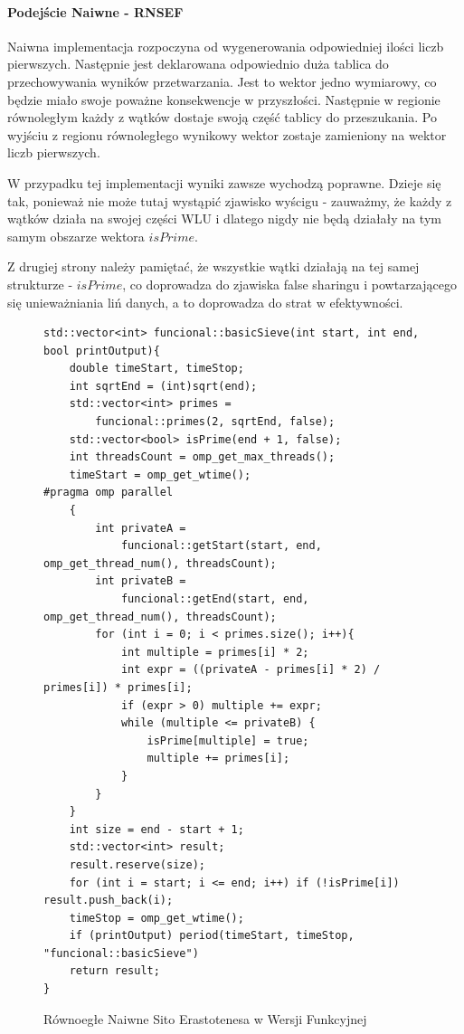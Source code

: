 \documentclass{article}
\begin{document}
                    \paragraph{Podejście Naiwne - \gls{RNSEF}}
                        Naiwna implementacja rozpoczyna od wygenerowania odpowiedniej ilości liczb pierwszych. Następnie jest deklarowana odpowiednio duża tablica do przechowywania wyników przetwarzania. Jest to wektor jedno wymiarowy, co będzie miało swoje poważne konsekwencje w przyszłości. Następnie w regionie równoległym każdy z wątków dostaje swoją część tablicy do przeszukania. Po wyjściu z regionu równoległego wynikowy wektor zostaje zamieniony na wektor liczb pierwszych.
                        
                        W przypadku tej implementacji wyniki zawsze wychodzą poprawne. Dzieje się tak, ponieważ nie może tutaj wystąpić zjawisko wyścigu - zauważmy, że każdy z wątków działa na swojej części \gls{WLU} i dlatego nigdy nie będą działały na tym samym obszarze wektora $isPrime$.
                        
                        Z drugiej strony należy pamiętać, że wszystkie wątki działają na tej samej strukturze - $isPrime$, co doprowadza do zjawiska false sharingu i powtarzającego się unieważniania liń danych, a to doprowadza do strat w efektywności.
                        \begin{figure}
                            \begin{verbatim}
std::vector<int> funcional::basicSieve(int start, int end, bool printOutput){
    double timeStart, timeStop;
    int sqrtEnd = (int)sqrt(end);
    std::vector<int> primes = 
        funcional::primes(2, sqrtEnd, false);
    std::vector<bool> isPrime(end + 1, false);
    int threadsCount = omp_get_max_threads();
    timeStart = omp_get_wtime();
#pragma omp parallel 
    {
        int privateA = 
            funcional::getStart(start, end, omp_get_thread_num(), threadsCount);
        int privateB = 
            funcional::getEnd(start, end, omp_get_thread_num(), threadsCount);
        for (int i = 0; i < primes.size(); i++){
            int multiple = primes[i] * 2;
            int expr = ((privateA - primes[i] * 2) / primes[i]) * primes[i];
            if (expr > 0) multiple += expr;
            while (multiple <= privateB) {
                isPrime[multiple] = true;
                multiple += primes[i];
            }
        }
    }
    int size = end - start + 1;
    std::vector<int> result;
    result.reserve(size);
    for (int i = start; i <= end; i++) if (!isPrime[i]) result.push_back(i);
    timeStop = omp_get_wtime();
    if (printOutput) period(timeStart, timeStop, "funcional::basicSieve")
    return result;
}
                            \end{verbatim}
                            \caption{Równoegłe Naiwne Sito Erastotenesa w Wersji Funkcyjnej}
                        \end{figure}
                        
\end{document}
